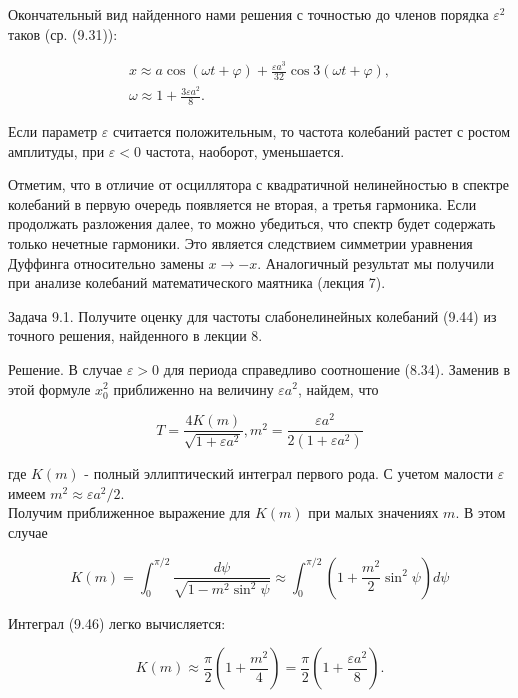 \documentclass[10pt]{article}
\begin{document}
Окончательный вид найденного нами решения с точностью до членов порядка $\varepsilon^{2}$ таков (ср. (9.31)):


\begin{gather*}
x \approx a \cos (\omega t+\varphi)+\frac{\varepsilon a^{3}}{32} \cos 3(\omega t+\varphi),  \tag{9.43}\\
\omega \approx 1+\frac{3 \varepsilon a^{2}}{8} . \tag{9.44}
\end{gather*}


Если параметр $\varepsilon$ считается положительным, то частота колебаний растет с ростом амплитуды, при $\varepsilon<0$ частота, наоборот, уменьшается.

Отметим, что в отличие от осциллятора с квадратичной нелинейностью в спектре колебаний в первую очередь появляется не вторая, а третья гармоника. Если продолжать разложения далее, то можно убедиться, что спектр будет содержать только нечетные гармоники. Это является следствием симметрии уравнения Дуффинга относительно замены $x \rightarrow-x$. Аналогичный результат мы получили при анализе колебаний математического маятника (лекция 7).

Задача 9.1. Получите оценку для частоты слабонелинейных колебаний (9.44) из точного решения, найденного в лекции 8.

Решение. В случае $\varepsilon>0$ для периода справедливо соотношение (8.34). Заменив в этой формуле $x_{0}^{2}$ приближенно на величину $\varepsilon a^{2}$, найдем, что


\begin{equation*}
T=\frac{4 K(m)}{\sqrt{1+\varepsilon a^{2}}}, m^{2}=\frac{\varepsilon a^{2}}{2\left(1+\varepsilon a^{2}\right)} \tag{9.45}
\end{equation*}


где $K(m)$ - полный эллиптический интеграл первого рода. С учетом малости $\varepsilon$ имеем $m^{2} \approx \varepsilon a^{2} / 2$.\\
Получим приближенное выражение для $K(m)$ при малых значениях $m$. В этом случае


\begin{equation*}
K(m)=\int_{0}^{\pi / 2} \frac{d \psi}{\sqrt{1-m^{2} \sin ^{2} \psi}} \approx \int_{0}^{\pi / 2}\left(1+\frac{m^{2}}{2} \sin ^{2} \psi\right) d \psi \tag{9.46}
\end{equation*}


Интеграл (9.46) легко вычисляется:


\begin{equation*}
K(m) \approx \frac{\pi}{2}\left(1+\frac{m^{2}}{4}\right)=\frac{\pi}{2}\left(1+\frac{\varepsilon a^{2}}{8}\right) . \tag{9.47}
\end{equation*}
\end{document}
